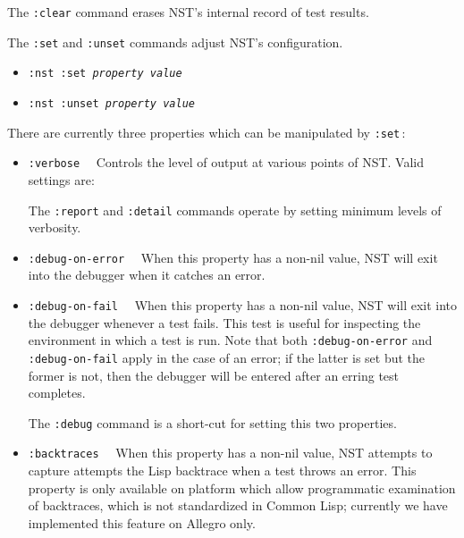 The \texttt{:clear} command erases NST's internal record of test
results.

The \texttt{:set} and \texttt{:unset} commands adjust NST's
configuration.
\begin{itemize}
\item\texttt{:nst :set {\itshape property} {\itshape value}}
\item\texttt{:nst :unset {\itshape property} {\itshape value}}
\end{itemize}
There are currently three properties which can be manipulated by
\texttt{:set}\,:
\begin{itemize}
\item\texttt{:verbose}~~ Controls the
  level of output at various points of NST.  Valid settings are:

  The \texttt{:report} and \texttt{:detail} commands operate by
  setting minimum levels of verbosity.

\item\texttt{:debug-on-error}~~
  When this property has a non-nil value, NST will exit into the
  debugger when it catches an error.

\item\texttt{:debug-on-fail}~~
  When this property has a non-nil value, NST will exit into the
  debugger whenever a test fails.  This test is useful for inspecting
  the environment in which a test is run.  Note that both
  \texttt{:debug-on-error} and \texttt{:debug-on-fail} apply in the
  case of an error; if the latter is set but the former is not, then
  the debugger will be entered after an erring test completes.

  The \texttt{:debug} command is a short-cut for setting this
  two properties.

\item\texttt{:backtraces}~~
  When this property has a non-nil value, NST attempts to capture
  attempts the Lisp backtrace when a test throws an error.  This
  property is only available on platform which allow programmatic
  examination of backtraces, which is not standardized in Common Lisp;
  currently we have implemented this feature on Allegro only.


\end{itemize}
